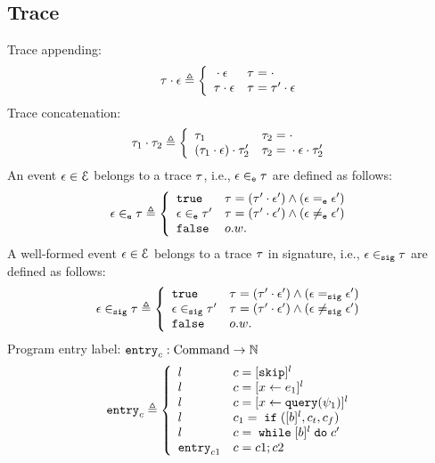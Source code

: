 %
\subsection{Trace}
Trace appending:
\[
  \trace \cdot \event \triangleq
  \left\{
  \begin{array}{ll} 
    {} \cdot \event           & \trace =  \cdot \\
    \trace \cdot \event    & \trace =  \trace' \cdot \event\\ 
  \end{array}
  \right.
\]
%
Trace concatenation:
\[
  \trace_1 \cdot \trace_2 \triangleq
  \left\{
  \begin{array}{ll} 
    \trace_1                                  & \trace_2 =  \cdot \\
    (\trace_1 \cdot \event) \cdot \trace_2'    & \trace_2 =  {} \cdot \event \cdot \trace_2'\\ 
  \end{array}
  \right.
\]
%
An event $\mathtt{\epsilon} \in \mathcal{E}$ belongs to a trace $\mathtt{\tau}$, i.e., $\mathtt{\epsilon} \in_{\mathtt{e}} \mathtt{\tau}$ are defined as follows:
%
\begin{equation}
  \event \eventin \trace  
  \triangleq \left\{
  \begin{array}{ll} 
    \etrue                  & \trace =  (\trace' \cdot \event') \land (\event \eventeq \event') \\
    \event \eventin \trace' & \trace =  (\trace' \cdot \event') \land (\event \eventneq \event') \\ 
    \efalse                 & o.w.
  \end{array}
  \right.
\end{equation}
%
A well-formed event $\mathtt{\epsilon} \in \mathcal{E}$ belongs to a trace $\mathtt{\tau}$ in signature, 
i.e., $\mathtt{\epsilon} \in_{\mathtt{sig}} \mathtt{\tau}$ are defined as follows:
\begin{equation}
  \event \sigin \trace  
  \triangleq \left\{
  \begin{array}{ll} 
    \etrue                  & \trace =  (\trace' \cdot \event') \land (\event \sigeq \event') \\
    \event \sigin \trace'   & \trace =  (\trace' \cdot \event') \land (\event \signeq \event') \\ 
    \efalse                 & o.w.
  \end{array}
  \right.
\end{equation}
%
%
Program entry label: $\mathtt{entry}_c : \mbox{Command} \to \mathbb{N}$ 
\[
  \entry_c \triangleq 
\left\{
  \begin{array}{ll} 
     l       
    & c = [\eskip]{}^l
    \\ 
    l    & c = [\assign{x}{\expr_1}]{}^l
    \\ 
    l      
    & c = [\assign{x}{\query(\qexpr_1)}]{}^l
    \\
   l
    & c_1 = \eif([b]{}^l, c_t, c_f)
    \\ 
    l         
    & c = \ewhile [b]^l \edo c'
    \\ 
    \entry_{c1}
    & c = c1;c2
  \end{array}
  \right.
\]
